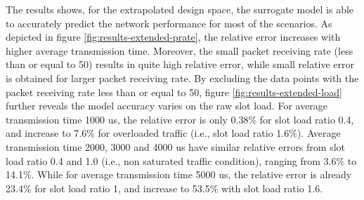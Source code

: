 The results shows, for the extrapolated design space, the surrogate model is able to accurately predict the network performance for most of the scenarios. As depicted in figure \ref{fig:results-extended-prate}, the relative error increases with higher average transmission time. Moreover, the small packet receiving rate (less than or equal to 50) results in quite high relative error, while small relative error is obtained for larger packet receiving rate. By excluding the data points with the packet receiving rate less than or equal to 50, figure \ref{fig:results-extended-load} further reveals the model accuracy varies on the \gls{raw} slot load. For average transmission time 1000 us, the relative error is only 0.38\% for slot load ratio 0.4, and increase to 7.6\% for overloaded traffic (i.e., slot load ratio 1.6\%). Average transmission time 2000, 3000 and 4000 us have similar relative errors from slot load ratio 0.4 and 1.0 (i.e., non saturated traffic condition), ranging from 3.6\% to 14.1\%. While for average transmission time 5000 us, the relative error is already 23.4\% for slot load ratio 1, and increase to 53.5\% with slot load ratio 1.6.







